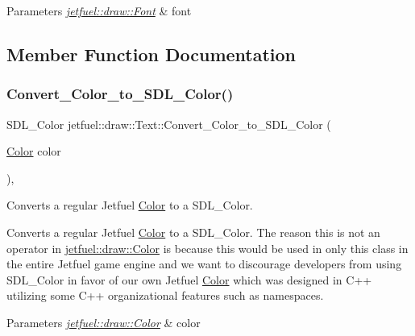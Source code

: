 \begin{DoxyParams}{Parameters}
{\em \hyperlink{classjetfuel_1_1draw_1_1Font}{jetfuel\+::draw\+::\+Font}} & font \\
\hline
\end{DoxyParams}


\subsection{Member Function Documentation}
\mbox{\label{classjetfuel_1_1draw_1_1Text_a86075093466a1a7feef9675694e5b014}} 
\subsubsection{\texorpdfstring{Convert\+\_\+\+Color\+\_\+to\+\_\+\+S\+D\+L\+\_\+\+Color()}{Convert\_Color\_to\_SDL\_Color()}}
{\footnotesize\ttfamily S\+D\+L\+\_\+\+Color jetfuel\+::draw\+::\+Text\+::\+Convert\+\_\+\+Color\+\_\+to\+\_\+\+S\+D\+L\+\_\+\+Color (\begin{DoxyParamCaption}\item[{\hyperlink{classjetfuel_1_1draw_1_1Color}{Color}}]{color }\end{DoxyParamCaption})\hspace{0.3cm}{\ttfamily [inline]}, {\ttfamily [protected]}}



Converts a regular Jetfuel \hyperlink{classjetfuel_1_1draw_1_1Color}{Color} to a S\+D\+L\+\_\+\+Color. 

Converts a regular Jetfuel \hyperlink{classjetfuel_1_1draw_1_1Color}{Color} to a S\+D\+L\+\_\+\+Color. The reason this is not an operator in \hyperlink{classjetfuel_1_1draw_1_1Color}{jetfuel\+::draw\+::\+Color} is because this would be used in only this class in the entire Jetfuel game engine and we want to discourage developers from using S\+D\+L\+\_\+\+Color in favor of our own Jetfuel \hyperlink{classjetfuel_1_1draw_1_1Color}{Color} which was designed in C++ utilizing some C++ organizational features such as namespaces.


\begin{DoxyParams}{Parameters}
{\em \hyperlink{classjetfuel_1_1draw_1_1Color}{jetfuel\+::draw\+::\+Color}} & color \\
\hline
\end{DoxyParams}
\mbox{\label{classjetfuel_1_1draw_1_1Text_ac0b8a614277d6b575c52d127e9a673f2}} 
